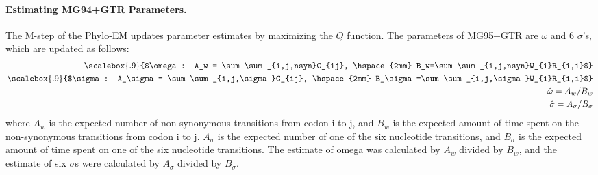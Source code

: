 %

\paragraph{Estimating MG94+GTR Parameters.} The M-step of the Phylo-EM updates parameter estimates by maximizing the $Q$ function. The parameters of MG95+GTR are $\omega$ and 6 $\sigma$'s, which are updated as follows:
%
\begin{align}
\begin{split}
    \scalebox{.9}{$\omega: A_w = \sum\sum_{i,j,nsyn}C_{ij}, \hspace{2mm} B_w=\sum\sum_{i,j,nsyn}W_{i}R_{i,i}$}\\
    \scalebox{.9}{$\sigma: A_\sigma = \sum\sum_{i,j,\sigma}C_{ij}, \hspace{2mm} B_\sigma=\sum\sum_{i,j,\sigma}W_{i}R_{i,i}$}\\
    \hat{\omega} = A_w/B_w \\
    \hat{\sigma} = A_\sigma/B_\sigma
\end{split}
\end{align}
%
where $A_w$ is the expected number of non-synonymous transitions from codon i to j, and $B_w$ is the expected amount of time spent on the non-synonymous transitions from codon i to j. $A_\sigma$ is the expected number of one of the six nucleotide transitions, and $B_\sigma$ is the expected amount of time spent on one of the six nucleotide transitions. The estimate of omega was calculated by  $A_w$ divided by $B_w$, and the estimate of six $\sigma$s were calculated by $A_\sigma$ divided by $B_\sigma$. 

